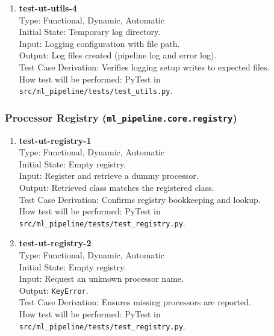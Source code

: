 \documentclass[12pt, titlepage]{article}
\begin{document}
\begin{enumerate}
\item \textbf{test-ut-utils-4}\\
Type: Functional, Dynamic, Automatic\\
Initial State: Temporary log directory.\\
Input: Logging configuration with file path.\\
Output: Log files created (pipeline log and error log).\\
Test Case Derivation: Verifies logging setup writes to expected files.\\
How test will be performed: PyTest in \texttt{src/ml\_pipeline/tests/test\_utils.py}.\\
\end{enumerate}

\subsubsection{Processor Registry (\texttt{ml\_pipeline.core.registry})}

\begin{enumerate}
\item \textbf{test-ut-registry-1}\\
Type: Functional, Dynamic, Automatic\\
Initial State: Empty registry.\\
Input: Register and retrieve a dummy processor.\\
Output: Retrieved class matches the registered class.\\
Test Case Derivation: Confirms registry bookkeeping and lookup.\\
How test will be performed: PyTest in \texttt{src/ml\_pipeline/tests/test\_registry.py}.\\

\item \textbf{test-ut-registry-2}\\
Type: Functional, Dynamic, Automatic\\
Initial State: Empty registry.\\
Input: Request an unknown processor name.\\
Output: \texttt{KeyError}.\\
Test Case Derivation: Ensures missing processors are reported.\\
How test will be performed: PyTest in \texttt{src/ml\_pipeline/tests/test\_registry.py}.\\
\end{enumerate}
\end{document}
